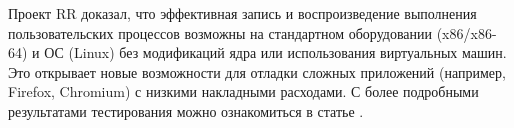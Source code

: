 Проект RR доказал, что эффективная запись и воспроизведение выполнения пользовательских процессов возможны 
на стандартном оборудовании (x86/x86-64) и ОС (Linux) без модификаций ядра или использования виртуальных машин. 
Это открывает новые возможности для отладки сложных приложений (например, Firefox, Chromium) с низкими накладными расходами.
С более подробными результатами тестирования можно ознакомиться в статье \cite{rr-paper}.